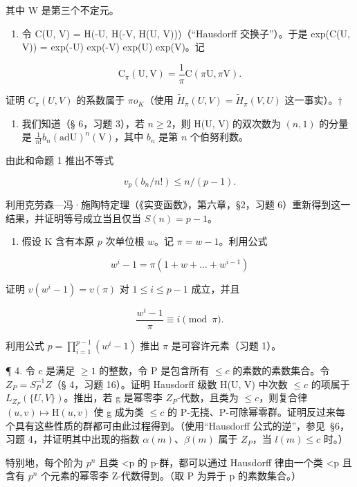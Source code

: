 其中 W 是第三个不定元。

\begin{enumerate}
\def\labelenumi{(\alph{enumi})}
\setcounter{enumi}{4}
\tightlist
\item
  令 C(U, V) = H(-U, H(-V, H(U, V)))（“Hausdorff 交换子”）。于是 exp(C(U, V)) = exp(-U) exp(-V) exp(U) exp(V)。记
\end{enumerate}

\[
\mathrm{C} _ {\pi} (\mathrm{U}, \mathrm{V}) = \frac {1}{\pi} \mathrm{C} (\pi \mathrm{U}, \pi \mathrm{V}).
\]

证明 \(C_{\pi}(U,V)\) 的系数属于 \(\pi o_{K}\)（使用 \(\tilde{H}_{\pi}(U,V)=\tilde{H}_{\pi}(V,U)\) 这一事实）。†

\begin{enumerate}
\def\labelenumi{\arabic{enumi}.}
\setcounter{enumi}{1}
\tightlist
\item
  我们知道（§ 6，习题 3），若 \(n \geqslant 2\)，则 H(U, V) 的双次数为 \((n, 1)\) 的分量是 \(\frac{1}{n!} b_n(\mathrm{ad}\mathrm{U})^n (\mathrm{V})\)，其中 \(b_n\) 是第 \(n\) 个伯努利数。
\end{enumerate}

由此和命题 1 推出不等式

\[
v _ {p} (b _ {n} / n!) \leqslant n / (p - 1).
\]

利用克劳森—冯·施陶特定理（《实变函数》，第六章，§2，习题 6）重新得到这一结果，并证明等号成立当且仅当 \(S(n) = p - 1\)。

\begin{enumerate}
\def\labelenumi{\arabic{enumi}.}
\setcounter{enumi}{2}
\tightlist
\item
  假设 K 含有本原 \(p\) 次单位根 \(w\)。记 \(\pi = w - 1\)。利用公式
\end{enumerate}

\[
w ^ {i} - 1 = \pi (1 + w + \dots + w ^ {i - 1})
\]

证明 \(v(w^{i} - 1) = v(\pi)\) 对 \(1 \leqslant i \leqslant p - 1\) 成立，并且

\[
\frac {w ^ {i} - 1}{\pi} \equiv i \pmod {\pi}.
\]

利用公式 \(p = \prod_{i=1}^{p-1} (w^i - 1)\) 推出 \(\pi\) 是可容许元素（习题 1）。

¶ 4. 令 c 是满足 \(\geqslant1\) 的整数，令 P 是包含所有 \(\leqslant c\) 的素数的素数集合。令 \(Z_{P}=S_{P}^{-1}Z\)（§ 4，习题 16）。证明 Hausdorff 级数 H(U, V) 中次数 \(\leqslant c\) 的项属于 \(L_{Z_{P}}(\{U, V\})\)。推出，若 g 是幂零李 \(Z_{P}\)-代数，且类为 \(\leqslant c\)，则复合律 \((u,v)\mapsto\mathrm{H}(u,v)\) 使 g 成为类 \(\leqslant c\) 的 P-无挠、P-可除幂零群。证明反过来每个具有这些性质的群都可由此过程得到。（使用“Hausdorff 公式的逆”，参见~§6，习题 4，并证明其中出现的指数 \(\alpha(m)\)、\(\beta(m)\) 属于 \(Z_{P}\)，当 \(l(m)\leqslant c\) 时。）

特别地，每个阶为 \(p^{n}\) 且类 \textless p 的 p-群，都可以通过 Hausdorff 律由一个类 \textless p 且含有 \(p^{n}\) 个元素的幂零李 Z-代数得到。（取 P 为异于 p 的素数集合。）

